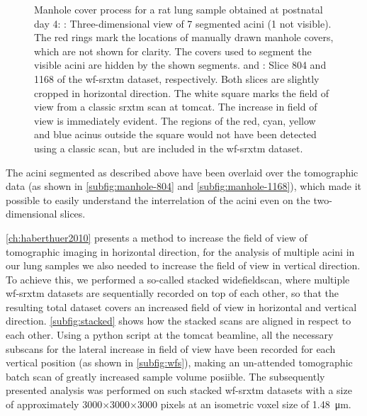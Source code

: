 \begin{figure}
{{%
			\label{subfig:manhole-1168}%
		}%
	}%
	\caption[Manhole cover process]{Manhole cover process for a rat lung sample obtained at postnatal day 4: : Three-dimensional view of 7 segmented acini (1 not visible). The red rings mark the locations of manually drawn manhole covers, which are not shown for clarity. The covers used to segment the visible acini are hidden by the shown segments.  and : Slice 804 and 1168 of the \ac{wf-srxtm} dataset, respectively. Both slices are slightly cropped in horizontal direction. The white square marks the field of view from a classic \ac{srxtm} scan at \ac{tomcat}. The increase in field of view is immediately evident. The regions of the red, cyan, yellow and blue acinus outside the square would not have been detected using a classic scan, but are included in the \ac{wf-srxtm} dataset.}
	\label{fig:manhole cover}%
\end{figure}%

The acini segmented as described above have been overlaid over the tomographic data (as shown in \autoref{subfig:manhole-804} and \ref{subfig:manhole-1168}), which made it possible to easily understand the interrelation of the acini even on the two-dimensional slices. 

\autoref{ch:haberthuer2010} presents a method to increase the field of view of tomographic imaging in horizontal direction, for the analysis of multiple acini in our lung samples we also needed to increase the field of view in vertical direction. To achieve this, we performed a so-called stacked widefieldscan, where multiple \ac{wf-srxtm} datasets are sequentially recorded on top of each other, so that the resulting total dataset covers an increased field of view in horizontal and vertical direction. \autoref{subfig:stacked} shows how the stacked scans are aligned in respect to each other. Using a python script at the \ac{tomcat} beamline, all the necessary subscans for the lateral increase in field of view have been recorded for each vertical position (as shown in \autoref{subfig:wfs}), making an un-attended tomographic batch scan of greatly increased sample volume posiible. The subsequently presented analysis was performed on such stacked \ac{wf-srxtm} datasets with a size of approximately 3000$\times$3000$\times$3000 pixels at an isometric voxel size of \SI{1.48}{\micro\meter}.

